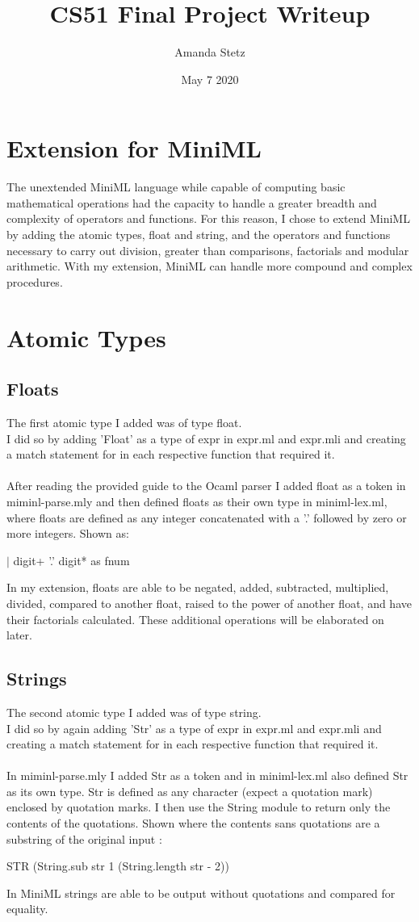 \documentclass{article}
\title{CS51 Final Project Writeup}
\author{Amanda Stetz}
\date{May 7 2020}
\begin{document}
\maketitle

\section{Extension for MiniML}
The unextended MiniML language while capable of computing basic mathematical operations had the capacity to handle a greater breadth and complexity of operators and functions. For this reason, I chose to extend MiniML by adding the atomic types, float and string, and the operators and functions necessary to carry out division, greater than comparisons, factorials and modular arithmetic. With my extension, MiniML can handle more compound and complex procedures. 
\section{Atomic Types}
\subsection{Floats}
The first atomic type I added was of type float.\\
I did so by adding 'Float' as a type of expr in expr.ml and expr.mli and creating a match statement for in each respective function that required it.\\
\\
After reading the provided guide to the Ocaml parser I added float as a token in miminl-parse.mly and then defined floats as their own type in miniml-lex.ml, where floats are defined as any integer concatenated with a '.' followed by zero or more integers. Shown as: 
\begin{center}
$|$ digit+ '.' digit* as fnum
\end{center}
In my extension, floats are able to be negated, added, subtracted, multiplied, divided, compared to another float, raised to the power of another float, and have their factorials calculated. These additional operations will be elaborated on later.
\subsection{Strings}
The second atomic type I added was of type string.\\
I did so by again adding 'Str' as a type of expr in expr.ml and expr.mli and creating a match statement for in each respective function that required it.\\
\\
In miminl-parse.mly I added Str as a token and in miniml-lex.ml also defined Str as its own type. Str is defined as any character (expect a quotation mark) enclosed by quotation marks. I then use the String module to return only the contents of the quotations. Shown where the contents sans quotations are a substring of the original input :
\begin{center}
STR (String.sub str 1 (String.length str - 2))
\end{center}
In MiniML strings are able to be output without quotations and compared for equality. 
\end{document}
